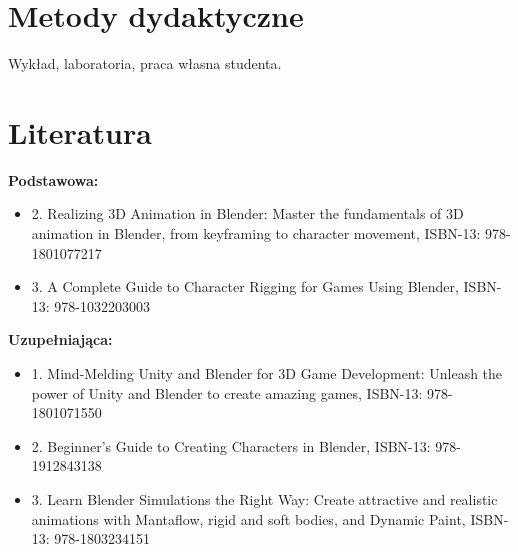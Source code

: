 \documentclass[12pt, a4paper]{article}
\begin{document}
\section{Metody dydaktyczne}

Wykład, laboratoria, praca własna studenta.

\section{Literatura}

\textbf{Podstawowa:}
\begin{itemize}
  \item 2. Realizing 3D Animation in Blender: Master the fundamentals of 3D animation in Blender, from keyframing to character movement, ISBN-13: 978-1801077217
  \item 3. A Complete Guide to Character Rigging for Games Using Blender, ISBN-13: 978-1032203003
\end{itemize}

\textbf{Uzupełniająca:}
\begin{itemize}
  \item 1. Mind-Melding Unity and Blender for 3D Game Development: Unleash the power of Unity and Blender to create amazing games, ISBN-13: 978-1801071550
  \item 2. Beginner’s Guide to Creating Characters in Blender, ISBN-13: 978-1912843138
  \item 3. Learn Blender Simulations the Right Way: Create attractive and realistic animations with Mantaflow, rigid and soft bodies, and Dynamic Paint, ISBN-13: 978-1803234151
\end{itemize}
\end{document}
